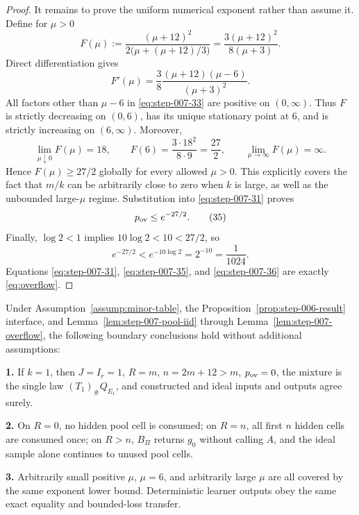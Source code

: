 \begin{proof}
It remains to prove the uniform numerical exponent rather than assume
it.  Define for \(\mu>0\)
\[
F(\mu)
:=
\frac{(\mu+12)^2}
{2\bigl(\mu+(\mu+12)/3\bigr)}
=\frac{3(\mu+12)^2}{8(\mu+3)}.
\tag{32}\label{eq:step-007-32}
\]
Direct differentiation gives
\[
F'(\mu)
=\frac38
\frac{(\mu+12)(\mu-6)}{(\mu+3)^2}.
\tag{33}\label{eq:step-007-33}
\]
All factors other than \(\mu-6\) in \eqref{eq:step-007-33} are positive on
\((0,\infty)\).  Thus \(F\) is strictly decreasing on \((0,6)\),
has its unique stationary point at \(6\), and is strictly increasing
on \((6,\infty)\).  Moreover,
\[
\lim_{\mu\downarrow0}F(\mu)=18,
\qquad
F(6)=\frac{3\cdot18^2}{8\cdot9}=\frac{27}{2},
\qquad
\lim_{\mu\to\infty}F(\mu)=\infty.
\tag{34}\label{eq:step-007-34}
\]
Hence \(F(\mu)\ge27/2\) globally for every allowed \(\mu>0\).  This
explicitly covers the fact that \(m/k\) can be arbitrarily close to
zero when \(k\) is large, as well as the unbounded large-\(\mu\)
regime.  Substitution into \eqref{eq:step-007-31} proves
\[
p_{\rm ov}\le e^{-27/2}.
\tag{35}\label{eq:step-007-35}
\]
Finally, \(\log2<1\) implies
\(10\log2<10<27/2\), so
\[
e^{-27/2}<e^{-10\log2}=2^{-10}=\frac1{1024}.
\tag{36}\label{eq:step-007-36}
\]
Equations \eqref{eq:step-007-31}, \eqref{eq:step-007-35}, and \eqref{eq:step-007-36} are exactly \eqref{eq:overflow}.

\end{proof}


\begin{proposition}
\label{prop:step-007-boundaries}

Under Assumption~\ref{assump:minor-table}, the 
Proposition~\ref{prop:step-006-result} interface, and Lemma~\ref{lem:step-007-pool-iid} through
Lemma~\ref{lem:step-007-overflow}, the following boundary conclusions
hold without additional assumptions:

\par\noindent\textbf{1.} If \(k=1\), then \(J=I_r=1\), \(R=m\),
   \(n=2m+12>m\), \(p_{\rm ov}=0\), the mixture is the single law
   \((T_1)_\#Q_{E_1}\), and constructed and ideal inputs and outputs
   agree surely.
\par\noindent\textbf{2.} On \(R=0\), no hidden pool cell is consumed; on \(R=n\), all first
   \(n\) hidden cells are consumed once; on \(R>n\), \(B_\Pi\) returns
   \(g_0\) without calling \(A\), and the ideal sample alone continues
   to unused pool cells.
\par\noindent\textbf{3.} Arbitrarily small positive \(\mu\), \(\mu=6\), and arbitrarily
   large \(\mu\) are all covered by the same exponent lower bound.
   Deterministic learner outputs obey the same exact equality and
   bounded-loss transfer.

\end{proposition}

